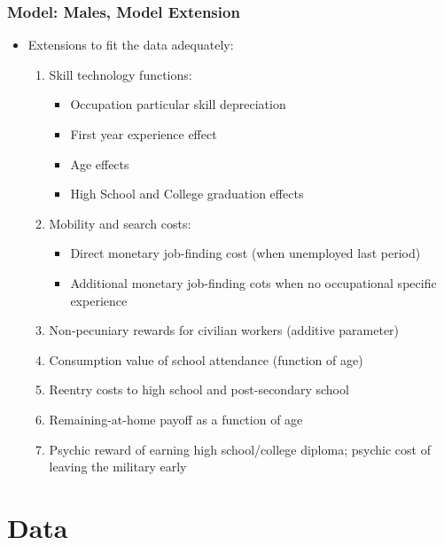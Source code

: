 \begin{frame}
	\frametitle{Model: Males, Model Extension}
	\begin{itemize}
		\item Extensions to fit the data adequately:
		\begin{enumerate}
		\item Skill technology functions:
			\begin{itemize}
				\item Occupation particular skill depreciation
				\item First year experience effect
				\item Age effects
				\item High School and College graduation effects
			\end{itemize}
		\item Mobility and search costs:
			\begin{itemize}
				\item Direct monetary job-finding cost (when unemployed last period)
				\item Additional monetary job-finding cots when no occupational specific experience
			\end{itemize}
		\item Non-pecuniary rewards for civilian workers (additive parameter)
		\item Consumption value of school attendance (function of age)
		\item Reentry costs to high school and post-secondary school
		\item Remaining-at-home payoff as a function of age
		\item Psychic reward of earning high school/college diploma; psychic cost of leaving the military early
		\end{enumerate}
	\end{itemize}
\end{frame}

\section{Data}

